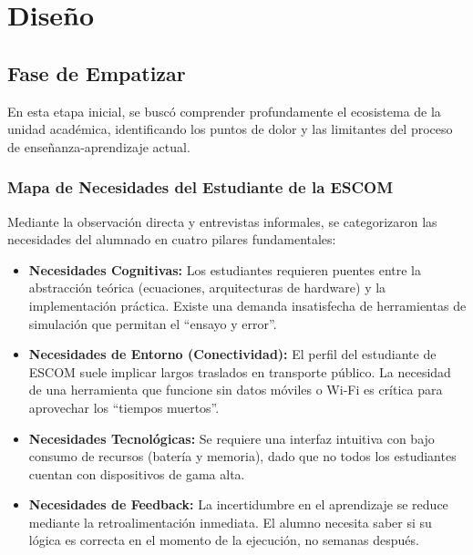 
\chapter{Diseño}
\label{ch:diseno}

\section{Fase de Empatizar}
\label{sec:empatizar}

En esta etapa inicial, se buscó comprender profundamente el ecosistema de la unidad académica,
identificando los puntos de dolor y las limitantes del proceso de enseñanza-aprendizaje actual.

\subsection{Mapa de Necesidades del Estudiante de la ESCOM}
\label{subsec:mapa_necesidades}

Mediante la observación directa y entrevistas informales, se categorizaron las necesidades del
alumnado en cuatro pilares fundamentales:

\begin{itemize}
    \item \textbf{Necesidades Cognitivas:} Los estudiantes requieren puentes entre la abstracción
    teórica (ecuaciones, arquitecturas de hardware) y la implementación práctica. Existe una demanda
    insatisfecha de herramientas de simulación que permitan el ``ensayo y error''.

    \item \textbf{Necesidades de Entorno (Conectividad):} El perfil del estudiante de ESCOM suele
    implicar largos traslados en transporte público. La necesidad de una herramienta que funcione
    sin datos móviles o Wi-Fi es crítica para aprovechar los ``tiempos muertos''.

    \item \textbf{Necesidades Tecnológicas:} Se requiere una interfaz intuitiva con bajo consumo
    de recursos (batería y memoria), dado que no todos los estudiantes cuentan con dispositivos de
    gama alta.

    \item \textbf{Necesidades de Feedback:} La incertidumbre en el aprendizaje se reduce mediante
    la retroalimentación inmediata. El alumno necesita saber si su lógica es correcta en el
    momento de la ejecución, no semanas después.
\end{itemize}

